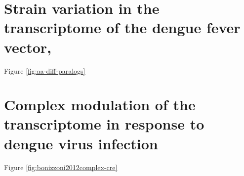 






\pagebreak
\section{Strain variation in the transcriptome of the dengue fever vector, \Aea}
Figure \ref{fig:aa-diff-paralogs}



\pagebreak
\section{Complex modulation of the \Aea transcriptome in response to dengue virus infection}
Figure \ref{fig:bonizzoni2012complex-cre}





